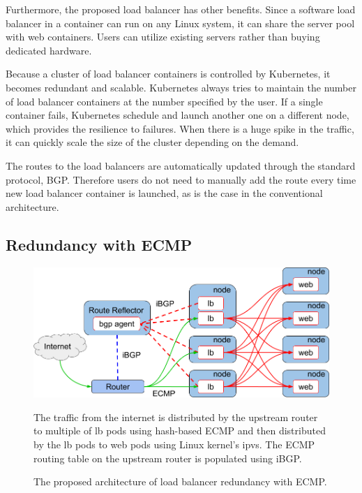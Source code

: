 Furthermore, the proposed load balancer has other benefits.
Since a software load balancer in a container can run on any Linux system, it can share the server pool with web containers.
Users can utilize existing servers rather than buying dedicated hardware.

Because a cluster of load balancer containers is controlled by Kubernetes, it becomes redundant and scalable.
Kubernetes always tries to maintain the number of load balancer containers at the number specified by the user.
If a single container fails, Kubernetes schedule and launch another one on a different node, which provides the resilience to failures.
When there is a huge spike in the traffic, it can quickly scale the size of the cluster depending on the demand.

The routes to the load balancers are automatically updated through the standard protocol, BGP.
Therefore users do not need to manually add the route every time new load balancer container is launched, as is the case in the conventional architecture.

\FloatBarrier

\subsection{Redundancy with ECMP}

\begin{figure}[tb]
  \centering
  \includegraphics[width=0.8\columnwidth]{Figs/ecmp.png}
\caption{The proposed architecture of load balancer redundancy with ECMP.}

\vspace{1mm}

\begin{minipage}{0.9\columnwidth}
  The traffic from the internet is distributed by the upstream router to multiple of lb pods using hash-based ECMP and then distributed by the lb pods to web pods using Linux kernel's ipvs.
  The ECMP routing table on the upstream router is populated using iBGP.
\end{minipage}
\label{fig:ecmp}
\end{figure}

